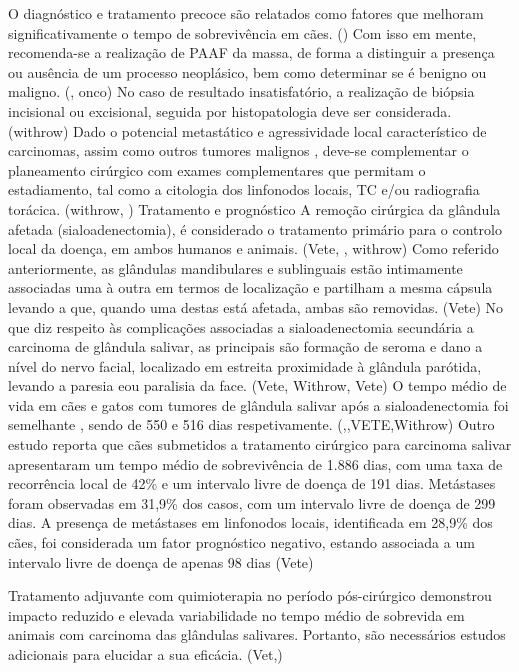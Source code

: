 O diagnóstico e tratamento precoce são relatados como fatores que melhoram significativamente o tempo de sobrevivência em cães. (\cite{Dobson2011}) Com isso em mente, recomenda-se a realização de PAAF da massa, de forma a distinguir a presença ou ausência de um processo neoplásico, bem como determinar se é benigno ou maligno. (\cite{Dobson2011}, onco) No caso de resultado insatisfatório, a realização de biópsia incisional ou excisional, seguida por histopatologia deve ser considerada. (withrow) Dado o potencial metastático e agressividade local característico de carcinomas, assim como outros tumores malignos , deve-se complementar o planeamento cirúrgico com exames complementares que permitam o estadiamento, tal como a citologia dos linfonodos locais, TC e/ou radiografia torácica. (withrow, \cite{Dobson2011})
Tratamento e prognóstico
A remoção cirúrgica da glândula afetada (sialoadenectomia), é considerado o tratamento primário para o controlo local da doença, em ambos humanos e animais. (Vete, \cite{Dobson2011}, withrow) Como referido anteriormente, as glândulas mandibulares e sublinguais estão intimamente associadas uma à outra em termos de localização e partilham a mesma cápsula levando a que, quando uma destas está afetada, ambas são removidas. (Vete) 
No que diz respeito às complicações associadas a sialoadenectomia secundária a carcinoma de glândula salivar, as principais são formação de seroma e dano a nível do nervo facial, localizado em estreita proximidade à glândula parótida, levando a paresia eou paralisia da face. (Vete, Withrow, Vete)
O tempo médio de vida em cães e gatos com tumores de glândula salivar após a sialoadenectomia foi semelhante \cite{Han2016}, sendo de 550 e 516 dias respetivamente.  (\cite{Hammer2001},\cite{Dobson2011},VETE,Withrow) Outro estudo reporta que cães submetidos a tratamento cirúrgico para carcinoma salivar apresentaram um tempo médio de sobrevivência de 1.886 dias, com uma taxa de recorrência local de 42\% e um intervalo livre de doença de 191 dias. Metástases foram observadas em 31,9\% dos casos, com um intervalo livre de doença de 299 dias. A presença de metástases em linfonodos locais, identificada em 28,9\% dos cães, foi considerada um fator prognóstico negativo, estando associada a um intervalo livre de doença de apenas 98 dias (Vete)


Tratamento adjuvante com quimioterapia no período pós-cirúrgico demonstrou impacto reduzido e elevada variabilidade no tempo médio de sobrevida em animais com carcinoma das glândulas salivares. Portanto, são necessários estudos adicionais para elucidar a sua eficácia. (Vet,\cite{Hammer2001})

